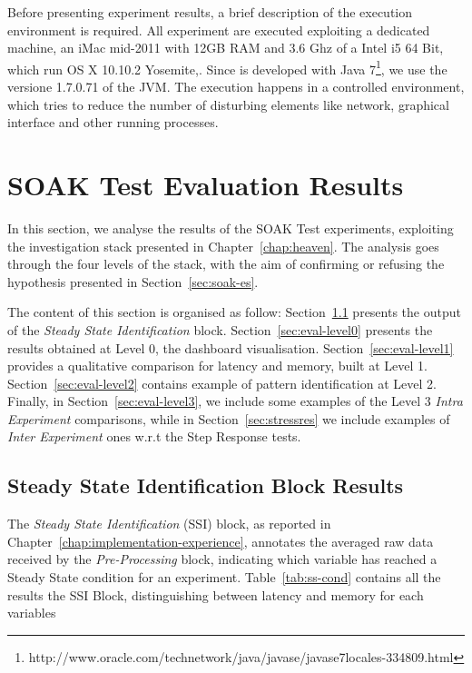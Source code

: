 Before presenting experiment results, a brief description of the execution environment is required. All experiment are executed exploiting a dedicated machine, an iMac mid-2011 with 12GB RAM and 3.6 Ghz of a Intel i5 64 Bit, which run OS X 10.10.2 Yosemite,. Since \name is developed with Java 7\footnote{http://www.oracle.com/technetwork/java/javase/javase7locales-334809.html}, we use the versione 1.7.0.71 of the JVM.
The execution happens in a controlled environment, which tries to reduce the number of disturbing elements like network, graphical interface and other running processes.

\section{SOAK Test Evaluation Results}\label{sec:soakres}

In this section, we analyse the results of the SOAK Test experiments, exploiting the investigation stack presented in Chapter~\ref{chap:heaven}. The analysis goes through the four levels of the stack, with the aim of confirming or refusing the hypothesis presented in Section~\ref{sec:soak-es}. 

The content of this section is organised as follow: 
Section~\ref{sec:eval-ssib} presents the output of the \textit{Steady State Identification} block. 
Section~\ref{sec:eval-level0} presents the results obtained at Level 0, the dashboard visualisation.  
Section~\ref{sec:eval-level1} provides a qualitative comparison for latency and memory, built at Level 1. 
Section~\ref{sec:eval-level2} contains example of pattern identification at Level 2. 
Finally, in Section~\ref{sec:eval-level3}, we include some examples of the Level 3 \textit{Intra Experiment }comparisons, while in Section~\ref{sec:stressres} we include examples of \textit{Inter Experiment }ones w.r.t the Step Response tests.


\subsection{Steady State Identification Block Results}\label{sec:eval-ssib}

The \textit{Steady State Identification} (SSI) block, as reported in Chapter~\ref{chap:implementation-experience}, annotates the averaged raw data received by the \textit{Pre-Processing} block, indicating which variable has reached a Steady State condition for an experiment. Table~\ref{tab:ss-cond} contains all the results the SSI Block, distinguishing between latency and memory for each variables


